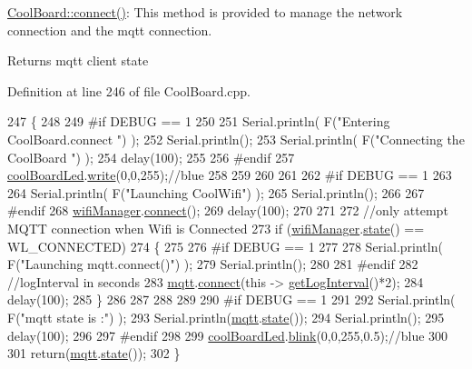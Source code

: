 \hyperlink{class_cool_board_a519de78b807f8ec6463ff484eb925918}{Cool\+Board\+::connect()}\+: This method is provided to manage the network connection and the mqtt connection.

\begin{DoxyReturn}{Returns}
mqtt client state 
\end{DoxyReturn}


Definition at line 246 of file Cool\+Board.\+cpp.


\begin{DoxyCode}
247 \{
248 
249 \textcolor{preprocessor}{#if DEBUG == 1  }
250 
251     Serial.println( F(\textcolor{stringliteral}{"Entering CoolBoard.connect "}) );
252     Serial.println();
253     Serial.println( F(\textcolor{stringliteral}{"Connecting the CoolBoard  "}) );
254     delay(100);
255 
256 \textcolor{preprocessor}{#endif}
257     \hyperlink{class_cool_board_a1b1d3c684a5baa56b08486e192fd8e97}{coolBoardLed}.\hyperlink{class_cool_board_led_a30fadd4cbec17ceea428bf7a32207e87}{write}(0,0,255);\textcolor{comment}{//blue}
258 
259     
260             
261     
262 \textcolor{preprocessor}{#if DEBUG == 1      }
263 
264     Serial.println( F(\textcolor{stringliteral}{"Launching CoolWifi"}) );
265     Serial.println();
266 
267 \textcolor{preprocessor}{#endif}
268     \hyperlink{class_cool_board_acd88e6003606b47479ebba81e4aceeca}{wifiManager}.\hyperlink{class_cool_wifi_ad060353050f40d032a2dbf9e54a768bf}{connect}();
269     delay(100);
270 
271 
272     \textcolor{comment}{//only attempt MQTT connection when Wifi is Connected}
273     \textcolor{keywordflow}{if} (\hyperlink{class_cool_board_acd88e6003606b47479ebba81e4aceeca}{wifiManager}.\hyperlink{class_cool_wifi_a1c7b4d82a4098d346e7593dce92039fa}{state}() == WL\_CONNECTED)
274     \{
275 
276 \textcolor{preprocessor}{    #if DEBUG == 1  }
277     
278         Serial.println( F(\textcolor{stringliteral}{"Launching mqtt.connect()"}) );
279         Serial.println();
280     
281 \textcolor{preprocessor}{    #endif  }
282         \textcolor{comment}{//logInterval in seconds}
283         \hyperlink{class_cool_board_a2399f44d7c23c1149a335cb3b46d90f1}{mqtt}.\hyperlink{class_cool_m_q_t_t_a50075d0ab23a327ab897fd6adad20eda}{connect}(\textcolor{keyword}{this} -> \hyperlink{class_cool_board_a7508e029f2ee17bb747ffab599285e0d}{getLogInterval}()*2);
284         delay(100);
285     \}
286     
287         
288     
289     
290 \textcolor{preprocessor}{#if DEBUG == 1}
291 
292     Serial.println( F(\textcolor{stringliteral}{"mqtt state is :"}) );
293     Serial.println(\hyperlink{class_cool_board_a2399f44d7c23c1149a335cb3b46d90f1}{mqtt}.\hyperlink{class_cool_m_q_t_t_a5d003307eff78efbd585e42b43b72b6d}{state}());
294     Serial.println();
295     delay(100);
296 
297 \textcolor{preprocessor}{#endif}
298 
299     \hyperlink{class_cool_board_a1b1d3c684a5baa56b08486e192fd8e97}{coolBoardLed}.\hyperlink{class_cool_board_led_a96e1ea13003eee34c9dbcef340404426}{blink}(0,0,255,0.5);\textcolor{comment}{//blue}
300 
301     \textcolor{keywordflow}{return}(\hyperlink{class_cool_board_a2399f44d7c23c1149a335cb3b46d90f1}{mqtt}.\hyperlink{class_cool_m_q_t_t_a5d003307eff78efbd585e42b43b72b6d}{state}());
302 \}
\end{DoxyCode}
